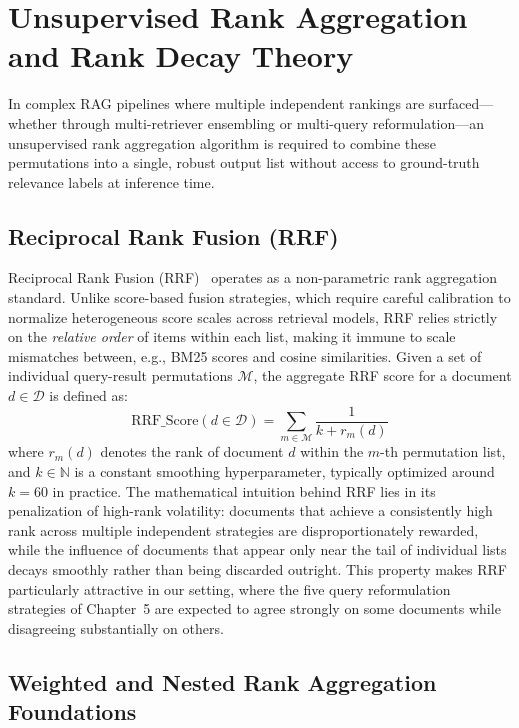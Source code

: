 \section{Unsupervised Rank Aggregation and Rank Decay Theory}
\label{sec:rank-aggregation}

In complex RAG pipelines where multiple independent rankings are surfaced---whether through multi-retriever ensembling or multi-query reformulation---an unsupervised rank aggregation algorithm is required to combine these permutations into a single, robust output list without access to ground-truth relevance labels at inference time.

\subsection{Reciprocal Rank Fusion (RRF)}

Reciprocal Rank Fusion (RRF)~\citep{cormack2009reciprocal} operates as a non-parametric rank aggregation standard. Unlike score-based fusion strategies, which require careful calibration to normalize heterogeneous score scales across retrieval models, RRF relies strictly on the \textit{relative order} of items within each list, making it immune to scale mismatches between, e.g., BM25 scores and cosine similarities. Given a set of individual query-result permutations $\mathcal{M}$, the aggregate RRF score for a document $d \in \mathcal{D}$ is defined as:
\begin{equation}
\text{RRF\_Score}(d \in \mathcal{D}) = \sum_{m \in \mathcal{M}} \frac{1}{k + r_m(d)}
\end{equation}
where $r_m(d)$ denotes the rank of document $d$ within the $m$-th permutation list, and $k \in \mathbb{N}$ is a constant smoothing hyperparameter, typically optimized around $k{=}60$ in practice. The mathematical intuition behind RRF lies in its penalization of high-rank volatility: documents that achieve a consistently high rank across multiple independent strategies are disproportionately rewarded, while the influence of documents that appear only near the tail of individual lists decays smoothly rather than being discarded outright. This property makes RRF particularly attractive in our setting, where the five query reformulation strategies of Chapter~5 are expected to agree strongly on some documents while disagreeing substantially on others.

\subsection{Weighted and Nested Rank Aggregation Foundations}

